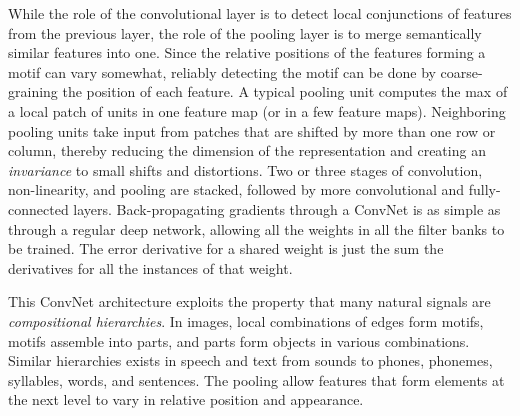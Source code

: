 \documentclass[10pts]{article}
\begin{document}
While the role of the convolutional layer is to detect local
conjunctions of features from the previous layer, the role of the
pooling layer is to merge semantically similar features into
one. Since the relative positions of the features forming a motif can
vary somewhat, reliably detecting the motif can be done by
coarse-graining the position of each feature. A typical pooling unit
computes the max of a local patch of units in one feature map (or in a
few feature maps). Neighboring pooling units take input from patches
that are shifted by more than one row or column, thereby reducing the
dimension of the representation and creating an {\em invariance} to
small shifts and distortions.  Two or three stages of convolution,
non-linearity, and pooling are stacked, followed by more convolutional
and fully-connected layers.  Back-propagating gradients through a
ConvNet is as simple as through a regular deep network, allowing all
the weights in all the filter banks to be trained. The error
derivative for a shared weight is just the sum the derivatives for all
the instances of that weight.

This ConvNet architecture exploits the property that many natural
signals are {\em compositional hierarchies}. In images, local
combinations of edges form motifs, motifs assemble into parts, and
parts form objects in various combinations.  Similar hierarchies
exists in speech and text from sounds to phones, phonemes, syllables,
words, and sentences. The pooling allow features that form elements at
the next level to vary in relative position and appearance. 
\end{document}

